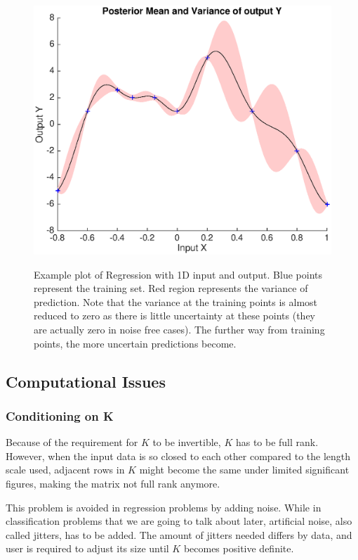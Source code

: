 \documentclass[14pt]{report}
\numberwithin{equation}{chapter}
\begin{document}
\begin{spacing}{2}
\begin{figure}[h]
\centering
\includegraphics[scale = 0.5]{RegressionPlot1D.eps}
\label{regression_1D_plot}
\caption{Example plot of Regression with 1D input and output. Blue points represent the training set. Red region represents the variance of prediction. Note that the variance at the training points is almost reduced to zero as there is little uncertainty at these points (they are actually zero in noise free cases). The further way from training points, the more uncertain predictions become.}
\end{figure}

\subsection{Computational Issues}

\subsubsection{Conditioning on K}
Because of the requirement for $K$ to be invertible, $K$ has to be full rank. However, when the input data is so closed to each other compared to the length scale used, adjacent rows in $K$ might become the same under limited significant figures, making the matrix not full rank anymore.

This problem is avoided in regression problems by adding noise. While in classification problems that we are going to talk about later, artificial noise, also called jitters, has to be added. The amount of jitters needed differs by data, and user is required to adjust its size until $K$ becomes positive definite.


\end{spacing}
\end{document}
